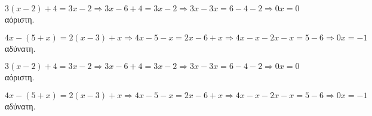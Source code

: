 \begin{rlist}
\item $3(x-2)+4=3x-2\Rightarrow 3x-6+4=3x-2\Rightarrow 3x-3x=6-4-2\Rightarrow 0x=0$ αόριστη.
\item $ 4x-(5+x)=2(x-3)+x\Rightarrow 4x-5-x=2x-6+x\Rightarrow 4x-x-2x-x=5-6\Rightarrow 0x=-1 $ αδύνατη.
\end{rlist}
\begin{rlist}
\item $3(x-2)+4=3x-2\Rightarrow 3x-6+4=3x-2\Rightarrow 3x-3x=6-4-2\Rightarrow 0x=0$ αόριστη.
\item $ 4x-(5+x)=2(x-3)+x\Rightarrow 4x-5-x=2x-6+x\Rightarrow 4x-x-2x-x=5-6\Rightarrow 0x=-1 $ αδύνατη.
\end{rlist}
